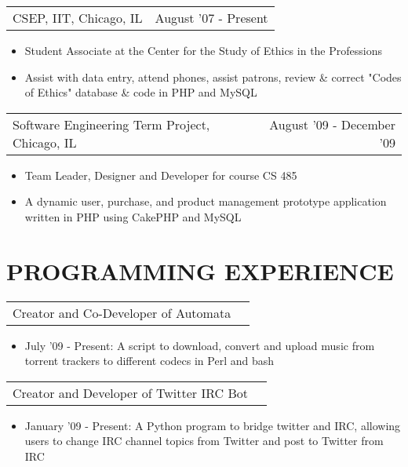 \documentclass[margin, line]{res}
\begin{document}
\begin{resume}
\begin{tabular}{p{3in} r} %
	CSEP, IIT, Chicago, IL &  August '07 - Present
\end{tabular}
	\begin{itemize}  \itemsep -2pt%
		\item[] Student Associate at the Center for the Study of Ethics in the Professions
		\item[] Assist with data entry, attend phones, assist patrons, review \& correct "Codes of Ethics" database \& code in PHP and MySQL
	\end{itemize}
	
\begin{tabular}{p{3in} r} %
	Software Engineering Term Project, Chicago, IL &  August '09 - December '09
\end{tabular}
	\begin{itemize}  \itemsep -2pt%
		\item[] Team Leader, Designer and Developer for course CS 485
		\item[] A dynamic user, purchase, and product management prototype application written in PHP using CakePHP and MySQL
	\end{itemize}

\section{PROGRAMMING EXPERIENCE}

\begin{tabular}{p{3in} r}
	Creator and Co-Developer of Automata
\end{tabular}	
	\begin{itemize} \itemsep -2pt
		\item[] July '09 - Present: A script to download, convert and upload music from torrent trackers to different codecs in Perl and bash
	\end{itemize}

\begin{tabular}{p{3in} r}
	Creator and Developer of Twitter IRC Bot
\end{tabular}	
	\begin{itemize} \itemsep -2pt
		\item[] January '09 - Present: A Python program to bridge twitter and IRC, allowing users to change IRC channel topics from Twitter and post to Twitter from IRC
	\end{itemize}


\end{resume}
\end{document}
